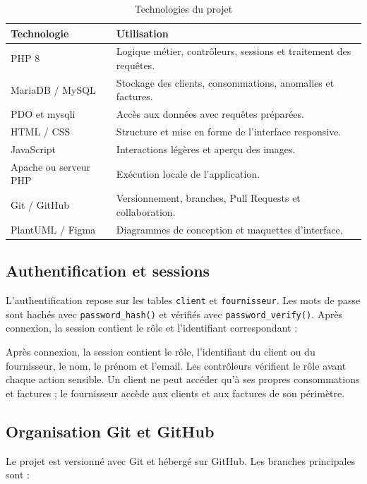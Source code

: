 \begin{table}[H]
\centering
\caption{Technologies du projet}
\label{tab:technologies}
\small
\begin{tabular}{p{}p{}}
\toprule
\textbf{Technologie} & \textbf{Utilisation} \\
\midrule
PHP 8 & Logique métier, contrôleurs, sessions et traitement des requêtes. \\
MariaDB / MySQL & Stockage des clients, consommations, anomalies et factures. \\
PDO et mysqli & Accès aux données avec requêtes préparées. \\
HTML / CSS & Structure et mise en forme de l'interface responsive. \\
JavaScript & Interactions légères et aperçu des images. \\
Apache ou serveur PHP & Exécution locale de l'application. \\
Git / GitHub & Versionnement, branches, Pull Requests et collaboration. \\
PlantUML / Figma & Diagrammes de conception et maquettes d'interface. \\
\bottomrule
\end{tabular}
\end{table}

\subsection{Authentification et sessions}

L'authentification repose sur les tables \texttt{client} et \texttt{fournisseur}. Les mots de passe sont hachés avec \texttt{password\_hash()} et vérifiés avec \texttt{password\_verify()}. Après connexion, la session contient le rôle et l'identifiant correspondant :

Après connexion, la session contient le rôle, l'identifiant du client ou du fournisseur, le nom, le prénom et l'email. Les contrôleurs vérifient le rôle avant chaque action sensible. Un client ne peut accéder qu'à ses propres consommations et factures ; le fournisseur accède aux clients et aux factures de son périmètre.

\subsection{Organisation Git et GitHub}

Le projet est versionné avec Git et hébergé sur GitHub. Les branches principales sont :

